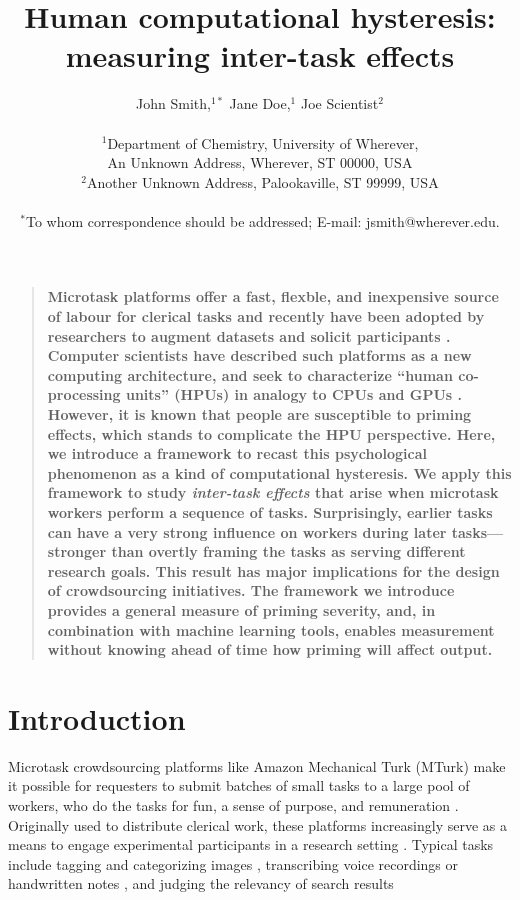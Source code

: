 \documentclass[12pt]{article}
\title{Human computational hysteresis: measuring inter-task effects}
\author
{John Smith,$^{1\ast}$ Jane Doe,$^{1}$ Joe Scientist$^{2}$\\
\\
\normalsize{$^{1}$Department of Chemistry, University of Wherever,}\\
\normalsize{An Unknown Address, Wherever, ST 00000, USA}\\
\normalsize{$^{2}$Another Unknown Address, Palookaville, ST 99999, USA}\\
\\
\normalsize{$^\ast$To whom correspondence should be addressed; E-mail:  jsmith@wherever.edu.}
}
\date{}
\newenvironment{sciabstract}{%
\begin{quote} \bf}
{\end{quote}}
\begin{document}
 


\baselineskip24pt


\maketitle 




\begin{sciabstract}
Microtask platforms offer a fast, flexble, and inexpensive source of labour for
clerical tasks \cite{Finnerty2013, chandler2013breaking, Berinsky2012351} and 
recently have been adopted by researchers to augment datasets and solicit 
participants \cite{paolacci2010running, Berinsky2012351, chandler2013breaking}.
Computer scientists have described such platforms as a new computing 
architecture, and seek to characterize “human co-processing units” (HPUs) in 
analogy to CPUs and GPUs \cite{5543192}. However, it is known that people are 
susceptible to 
priming effects\cite{No2007,Swaab200299,Gopher2000308,sohn2001task,Ghuman17062008,BJOP1796,BJOP1826,Gass1999549}, which stands to complicate the HPU 
perspective.  Here, we introduce a framework to recast this psychological 
phenomenon as a kind of computational hysteresis. 
We apply this framework to study \textit{inter-task effects} that arise when 
microtask 
workers perform a sequence of tasks. Surprisingly, earlier tasks can have a 
very strong influence on workers during later tasks---stronger than overtly
framing the tasks as serving different research goals.   
This result has major implications for the design of crowdsourcing initiatives.
The framework we introduce provides a general measure of priming severity, 
and, in combination with machine learning tools, enables measurement without
knowing ahead of time how priming will affect output.
\end{sciabstract}

\section*{Introduction}
Microtask crowdsourcing platforms like Amazon Mechanical Turk (MTurk) make it 
possible for requesters to submit batches of small tasks to a large pool of 
workers, who do the tasks for fun, a sense of purpose, and remuneration 
\cite{kazai2013analysis,Antin20122925}.  
Originally used to distribute clerical work, these platforms 
increasingly serve as a means to engage experimental 
participants in a research 
setting \cite{paolacci2010running,Berinsky2012351,snow2008cheap,alonso2009can}.
Typical tasks include tagging and categorizing images 
\cite{6116320,Zhai2012357}, transcribing voice recordings 
\cite{chandler2013breaking,paolacci2010running}
or handwritten notes \cite{Berinsky2012351,Finnerty2013}, and judging the 
relevancy of search results \cite{le2010ensuring,grady2010crowdsourcing,alonso2009can,kazai2013analysis}
\end{document}
